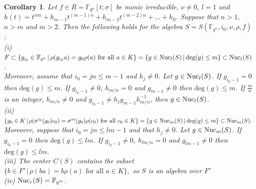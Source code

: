 \documentclass[12pt]{amsart}
\theoremstyle{plain}
\newtheorem{corollary}[theorem]{Corollary}
\theoremstyle{definition}
\numberwithin{equation}{section}
\numberwithin{figure}{section}
\begin{document}
\begin{corollary}\label{cor:nuclei K2}
Let $f\in R=\mathbb{F}_{q^n}[t;\sigma]$ be monic irreducible, $\nu\neq 0$, $l=1$ and 
$h(t)=t^{nm}+h_{m-1}t^{(m-1)n}+h_{m-2}t^{(m-2)n}+\dots+h_0$.  Suppose that $n>1$, $n>m$ and $m>2$.
 Then the following holds for the algebra $S=S(\mathbb{F}_{q^n},i_0,\nu,\rho,f)$:
\\ (i) $F\subset  \{g_{i_0}\in \mathbb{F}_{q^n} \,|\, \rho(g_{i_0} a) = g_0\rho(a)  \text{ for all } a\in K\} =\{g\in {\rm Nuc}_l(S)\,|\, \text{deg}(g)\leq m \}\subset {\rm Nuc}_l(S)$.
\\
Moreover, assume that $i_0=jn \leq m-1$ and  $h_j\not=0$. Let $g \in {\rm Nuc}_l(S)$.
If $g_{i_0-1}=0$ then $\text{deg}(g)\leq m$.
 If $g_{i_0-1}\not=0$, $h_{m/n} =0$  and  $g_{m-1}\not=0 $
then $\text{deg}(g)\leq m$.  If $\frac{m}{n}$ is  an integer, $h_{m/n}\not =0$ and $ g_{i_0-1}\not =h_j g_{m-1}h_{m/n}^{-1}$,
then $g \in  {\rm Nuc}_l(S)$.
\\ (ii)
$  \lbrace g_0\in K \,|\, \rho(\sigma^{i_0}(g_0) c_0) = \sigma^{m}(g_0)\rho(c_0) \text{ for all } c_0\in K\rbrace =
\{ g\in {\rm Nuc}_m(S) \,|\, \text{deg}(g)\leq m\}\subset {\rm Nuc}_m(S).$
Moreover, suppose that $i_0=jn \leq lm-1$ and  that $h_j\not=0$. Let $g \in {\rm Nuc}_m(S)$.
If $g_{i_0-1}=0$ then $\text{deg}(g)\leq lm$.  If $g_{i_0-1}\not=0$, $h_{lm/n} =0$  and  $g_{lm-1}\not=0 $
then $\text{deg}(g)\leq lm$.
\\ (iii) The center $ C(S)$ contains the subset $\lbrace b\in F' \,|\, \rho(b a) = b\rho(a) \text{ for all } a\in K\rbrace,$
 so $S$ is an algebra over $F'$
\\ (iv) ${\rm Nuc}_r(S)=\mathbb{F}_{q^m}$.
\end{corollary}
\end{document}
